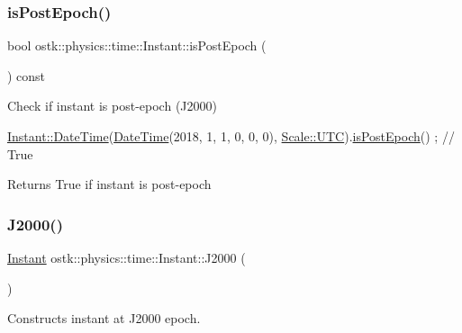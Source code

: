 \subsubsection{\texorpdfstring{is\+Post\+Epoch()}{isPostEpoch()}}
{\footnotesize\ttfamily bool ostk\+::physics\+::time\+::\+Instant\+::is\+Post\+Epoch (\begin{DoxyParamCaption}{ }\end{DoxyParamCaption}) const}



Check if instant is post-\/epoch (J2000) 


\begin{DoxyCode}
\hyperlink{classostk_1_1physics_1_1time_1_1_instant_afd5725574a02389b80fad4baff313c8a}{Instant::DateTime}(\hyperlink{classostk_1_1physics_1_1time_1_1_instant_afd5725574a02389b80fad4baff313c8a}{DateTime}(2018, 1, 1, 0, 0, 0), 
      \hyperlink{namespaceostk_1_1physics_1_1time_adf23d37bd8641fb76a0e98ab46a70df7a9234324ddf6b4176b57d803a925b7961}{Scale::UTC}).\hyperlink{classostk_1_1physics_1_1time_1_1_instant_a2e7fcfd9e7aae17b737ee138098b9771}{isPostEpoch}() ; \textcolor{comment}{// True}
\end{DoxyCode}


\begin{DoxyReturn}{Returns}
True if instant is post-\/epoch 
\end{DoxyReturn}
\mbox{\label{classostk_1_1physics_1_1time_1_1_instant_a3f84d0c2d0b140326d3b172b54e3ffff}} 
\subsubsection{\texorpdfstring{J2000()}{J2000()}}
{\footnotesize\ttfamily \hyperlink{classostk_1_1physics_1_1time_1_1_instant}{Instant} ostk\+::physics\+::time\+::\+Instant\+::\+J2000 (\begin{DoxyParamCaption}{ }\end{DoxyParamCaption})\hspace{0.3cm}{\ttfamily [static]}}



Constructs instant at J2000 epoch. 

